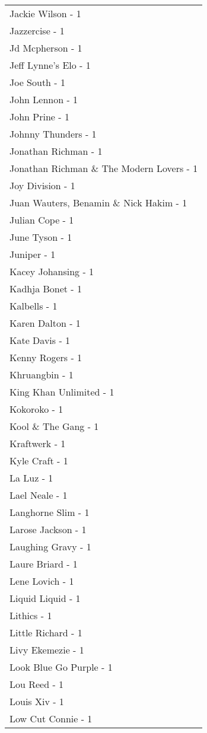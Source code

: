 \documentclass[
]{article}
\begin{document}
\begin{longtable}{l}
Jackie Wilson - 1 \\ 
Jazzercise - 1 \\ 
Jd Mcpherson - 1 \\ 
Jeff Lynne's Elo - 1 \\ 
Joe South - 1 \\ 
John Lennon - 1 \\ 
John Prine - 1 \\ 
Johnny Thunders - 1 \\ 
Jonathan Richman - 1 \\ 
Jonathan Richman \& The Modern Lovers - 1 \\ 
Joy Division - 1 \\ 
Juan Wauters, Benamin \& Nick Hakim - 1 \\ 
Julian Cope - 1 \\ 
June Tyson - 1 \\ 
Juniper - 1 \\ 
Kacey Johansing - 1 \\ 
Kadhja Bonet - 1 \\ 
Kalbells - 1 \\ 
Karen Dalton - 1 \\ 
Kate Davis - 1 \\ 
Kenny Rogers - 1 \\ 
Khruangbin - 1 \\ 
King Khan Unlimited - 1 \\ 
Kokoroko - 1 \\ 
Kool \& The Gang - 1 \\ 
Kraftwerk - 1 \\ 
Kyle Craft - 1 \\ 
La Luz - 1 \\ 
Lael Neale - 1 \\ 
Langhorne Slim - 1 \\ 
Larose Jackson - 1 \\ 
Laughing Gravy - 1 \\ 
Laure Briard - 1 \\ 
Lene Lovich - 1 \\ 
Liquid Liquid - 1 \\ 
Lithics - 1 \\ 
Little Richard - 1 \\ 
Livy Ekemezie - 1 \\ 
Look Blue Go Purple - 1 \\ 
Lou Reed - 1 \\ 
Louis Xiv - 1 \\ 
Low Cut Connie - 1 \\ 

\end{longtable}
\end{document}
